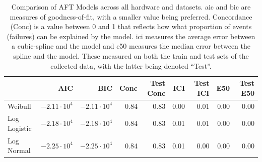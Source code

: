 \documentclass[sn-mathphys-num]{sn-jnl}%
\begin{document}
\begin{table}
\centering
\caption{Comparison of AFT Models across all hardware and datasets. \acrshort{aic} and \acrshort{bic} are measures of goodness-of-fit, with a smaller value being preferred. Concordance (Conc) is a value between 0 and 1 that reflects how what proportion of events (failures) can be explained by the model. \acrshort{ici} measures the average error between a cubic-spline and the model and \acrshort{e50} measures the median error between the spline and the model. These measured on both the train and test sets of the collected data, with the latter being denoted ``Test''.}
\label{tab:aft_summary}
\begin{tabular}{lrrrrrrrr}
\toprule
             & AIC              & BIC & Conc & Test Conc & ICI & Test ICI & E50 & Test E50 \\
\midrule
Weibull      & $-2.11\cdot10^4$ & $-2.11\cdot10^4$ & 0.84 & 0.83 & 0.00 & 0.01 & 0.00 & 0.00 \\
Log Logistic & $-2.18\cdot10^4$ & $-2.18\cdot10^4$ & 0.84 & 0.83 & 0.01 & 0.01 & 0.00 & 0.00 \\
Log Normal   & $-2.25\cdot10^4$ & $-2.25\cdot10^4$ & 0.84 & 0.83 & 0.01 & 0.00 & 0.00 & 0.00 \\
\bottomrule
\end{tabular}
\end{table}
\end{document}
